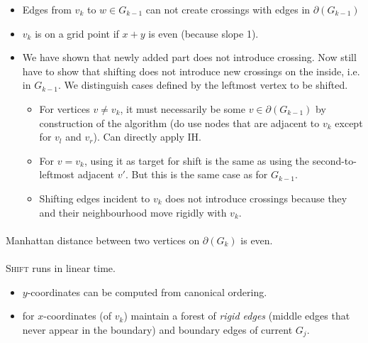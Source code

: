 \documentclass[10pt,twocolumn]{article}
\begin{document}
\begin{itemize}
\item Edges from $v_k$ to $w \in G_{k-1}$ can not create crossings with edges in
  $\partial(G_{k-1})$ 
\item $v_k$ is on a grid point if $x+y$ is even (because slope 1).
\item We have shown that newly added part does not introduce crossing. Now still
  have to show that shifting does not introduce new crossings on the inside,
  i.e. in $G_{k-1}$. We distinguish cases defined by the leftmost vertex to be shifted.
  \begin{itemize}
  \item For vertices $v \not= v_k$, it must necessarily be some $v \in
    \partial(G_{k-1})$ by construction of the algorithm (do use nodes that
    are adjacent to $v_k$ except for $v_l$ and $v_r$). Can directly apply IH.
  \item For $v = v_k$, using it as target for shift is the same as using the
    second-to-leftmost adjacent $v'$. But this is the same case as for $G_{k-1}$.
  \item Shifting edges incident to $v_k$ does not introduce crossings because
    they and their neighbourhood move rigidly with $v_k$.
  \end{itemize}
\end{itemize}

\paragraph{} Manhattan distance between two vertices on
$\partial(G_k)$ is even. 

\paragraph{} \textsc{Shift} runs in linear time.
\begin{itemize}
\item $y$-coordinates can be computed from canonical ordering.
\item for $x$-coordinates (of $v_k$) maintain a forest of \textit{rigid edges}
  (middle edges that never appear in the boundary) %
   and boundary
  edges of current $G_j$.
\end{itemize}
\end{document}
